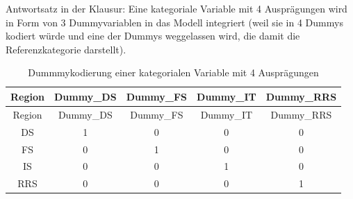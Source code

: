 \documentclass[
  10pt,
  letterpaper,
  a4paper, twoside]{scrreprt}
\begin{document}
\begin{tcolorbox}
Antwortsatz in der Klausur: Eine kategoriale Variable mit 4 Ausprägungen
wird in Form von 3 Dummyvariablen in das Modell integriert (weil sie in
4 Dummys kodiert würde und eine der Dummys weggelassen wird, die damit
die Referenzkategorie darstellt).

\begin{longtable}[]{@{}ccccc@{}}
\caption{Dummmykodierung einer kategorialen Variable mit 4
Ausprägungen}\tabularnewline
\toprule\noalign{}
Region & Dummy\_DS & Dummy\_FS & Dummy\_IT & Dummy\_RRS \\
\midrule\noalign{}
\endfirsthead
\toprule\noalign{}
Region & Dummy\_DS & Dummy\_FS & Dummy\_IT & Dummy\_RRS \\
\midrule\noalign{}
\endhead
\bottomrule\noalign{}
\endlastfoot
DS & 1 & 0 & 0 & 0 \\
FS & 0 & 1 & 0 & 0 \\
IS & 0 & 0 & 1 & 0 \\
RRS & 0 & 0 & 0 & 1 \\
\end{longtable}

\end{tcolorbox}
\end{document}
